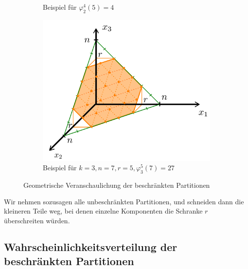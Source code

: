 \documentclass{article}
\begin{document}
\begin{figure}[ht]
    \centering
    \begin{subfigure}{.5\textwidth}
        \centering
        
        \caption{Beispiel für $\varphi_2^4(5)=4$}
        \label{fig:2d2}
    \end{subfigure}%
    \begin{subfigure}{.5\textwidth}
        \centering
        \includegraphics[width=\textwidth, keepaspectratio]{./img/3d2.png}
        \caption{Beispiel für $k=3, n=7, r=5, \varphi_3^5(7)=27$}
        \label{fig:3d2}
    \end{subfigure}
    \caption{Geometrische Veranschaulichung der beschränkten Partitionen}
    \label{fig:boundedpartitions}
\end{figure}

Wir nehmen sozusagen alle unbeschränkten Partitionen, und schneiden dann die kleineren Teile weg, bei denen einzelne Komponenten die Schranke $r$ überschreiten würden.

\subsection{Wahrscheinlichkeitsverteilung der beschränkten Partitionen}
\end{document}
